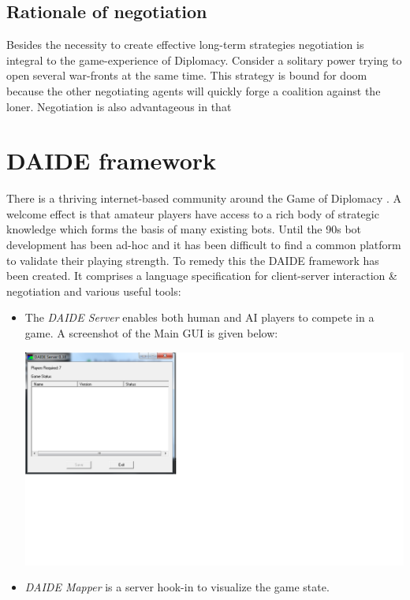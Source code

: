 \documentclass[pdftex,12pt,a4paper]{report}
\begin{document}
\subsection{Rationale of negotiation}

Besides the necessity to create effective long-term strategies
negotiation is integral to the game-experience of Diplomacy.
Consider a solitary power trying to open several war-fronts
at the same time. This strategy is bound for doom because 
the other negotiating agents will quickly forge a coalition
against the loner. Negotiation is also advantageous in that

\pagebreak

\section{DAIDE framework}

There is a thriving internet-based community around the Game of
Diplomacy \cite{DipArchive04} \cite{DipPouch04}. A welcome effect
is that amateur players have access to a rich body of strategic
knowledge which forms the basis of many existing bots. Until the
90s bot development has been ad-hoc and it has been difficult
to find a common platform to validate their playing strength. To remedy
this the DAIDE framework \cite{Daide04} has been created. It comprises
a language specification for client-server interaction \cite{DAIDEsyntax10}
 \& negotiation and various useful tools: 

\begin{itemize}

\item The \textit{DAIDE Server} enables both human and AI players to
      compete in a game. A screenshot of the Main GUI is given below:

\includegraphics{./images/DAIDEServer.png}

\item \textit{DAIDE Mapper} is a server hook-in to visualize
      the game state.




\end{itemize}
\end{document}

